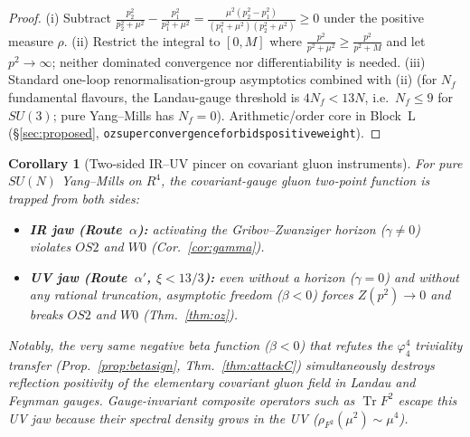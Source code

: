 \documentclass[11pt,a4paper]{article}
\def\R{R}\def\N{N}\def\Q{Q}\def\Z{Z}\def\Class{C}\def\OS{OS}\def\Gap{Gap}%
\theoremstyle{plain}
\newtheorem{corollary}[theorem]{Corollary}
\theoremstyle{definition}
\theoremstyle{remark}
\newcommand{\R}{\mathbb{R}}\newcommand{\N}{\mathbb{N}}\newcommand{\Q}{\mathbb{Q}}
\newcommand{\Z}{\mathbb{Z}}\newcommand{\Spec}{\operatorname{Spec}}
\newcommand{\OS}{\mathrm{OS}}\newcommand{\Gap}{\mathrm{Gap}}
\newcommand{\Class}{\mathcal{C}}\newcommand{\Htot}{\mathcal{H}}
\renewcommand{\_}{\oldunderscore\allowbreak}
\newcommand{\Lean}[1]{\texttt{\small #1}}
\begin{document}
\begin{proof}
(i) Subtract $\frac{p_2^2}{p_2^2+\mu^2}-\frac{p_1^2}{p_1^2+\mu^2}=\frac{\mu^2(p_2^2-p_1^2)}{(p_1^2+\mu^2)(p_2^2+\mu^2)}\ge0$ under the positive measure $\rho$. (ii) Restrict the integral to $[0,M]$ where $\frac{p^2}{p^2+\mu^2}\ge\frac{p^2}{p^2+M}$ and let $p^2\to\infty$; neither dominated convergence nor differentiability is needed. (iii) Standard one-loop renormalisation-group asymptotics \cite{OehmeZimmermann1980} combined with (ii) (for $N_f$ fundamental flavours, the Landau-gauge threshold is $4N_f<13N$, i.e.\ $N_f\le 9$ for $SU(3)$; pure Yang--Mills has $N_f=0$). Arithmetic/order core in Block~L (\S\ref{sec:proposed}, \Lean{oz\_superconvergence\_forbids\_positive\_weight}).
\end{proof}
\begin{corollary}[Two-sided IR--UV pincer on covariant gluon instruments]\label{cor:pincer}
For pure $SU(N)$ Yang--Mills on $\R^4$, the covariant-gauge gluon two-point function is trapped from both sides:
\begin{itemize}[leftmargin=20pt,itemsep=1pt]
\item \textbf{IR jaw (Route~$\alpha$):} activating the Gribov--Zwanziger horizon ($\gamma\neq0$) violates $\OS2$ and $W0$ (Cor.~\ref{cor:gamma}).
\item \textbf{UV jaw (Route~$\alpha'$, $\xi<13/3$):} even without a horizon ($\gamma=0$) and without any rational truncation, asymptotic freedom ($\beta<0$) forces $Z(p^2)\to0$ and breaks $\OS2$ and $W0$ (Thm.~\ref{thm:oz}).
\end{itemize}
Notably, the very same negative beta function ($\beta<0$) that refutes the $\varphi^4_4$ triviality transfer (Prop.~\ref{prop:betasign}, Thm.~\ref{thm:attackC}) simultaneously destroys reflection positivity of the elementary covariant gluon field in Landau and Feynman gauges. Gauge-invariant composite operators such as $\operatorname{Tr}F^2$ escape this UV jaw because their spectral density grows in the UV ($\rho_{F^2}(\mu^2)\sim\mu^4$).
\end{corollary}
\end{document}
